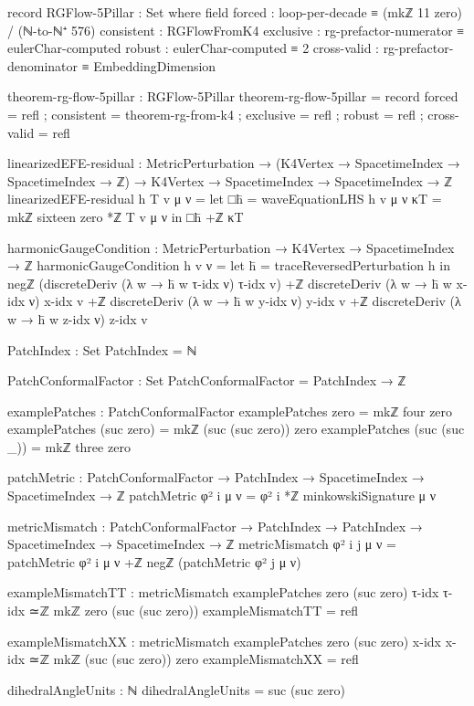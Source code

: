 \documentclass[11pt,a4paper]{book}
\begin{document}
\begin{code}
record RGFlow-5Pillar : Set where
  field
    forced       : loop-per-decade ≡ (mkℤ 11 zero) / (ℕ-to-ℕ⁺ 576)
    consistent   : RGFlowFromK4
    exclusive    : rg-prefactor-numerator ≡ eulerChar-computed
    robust       : eulerChar-computed ≡ 2
    cross-valid  : rg-prefactor-denominator ≡ EmbeddingDimension

theorem-rg-flow-5pillar : RGFlow-5Pillar
theorem-rg-flow-5pillar = record
  { forced      = refl
  ; consistent  = theorem-rg-from-k4
  ; exclusive   = refl
  ; robust      = refl
  ; cross-valid = refl
  }


linearizedEFE-residual : MetricPerturbation → 
                          (K4Vertex → SpacetimeIndex → SpacetimeIndex → ℤ) →
                          K4Vertex → SpacetimeIndex → SpacetimeIndex → ℤ
linearizedEFE-residual h T v μ ν = 
  let □h̄ = waveEquationLHS h v μ ν
      κT  = mkℤ sixteen zero *ℤ T v μ ν
  in □h̄ +ℤ κT


harmonicGaugeCondition : MetricPerturbation → K4Vertex → SpacetimeIndex → ℤ
harmonicGaugeCondition h v ν = 
  let h̄ = traceReversedPerturbation h
  in negℤ (discreteDeriv (λ w → h̄ w τ-idx ν) τ-idx v) +ℤ
     discreteDeriv (λ w → h̄ w x-idx ν) x-idx v +ℤ
     discreteDeriv (λ w → h̄ w y-idx ν) y-idx v +ℤ
     discreteDeriv (λ w → h̄ w z-idx ν) z-idx v


PatchIndex : Set
PatchIndex = ℕ

PatchConformalFactor : Set
PatchConformalFactor = PatchIndex → ℤ

examplePatches : PatchConformalFactor
examplePatches zero = mkℤ four zero
examplePatches (suc zero) = mkℤ (suc (suc zero)) zero
examplePatches (suc (suc _)) = mkℤ three zero

patchMetric : PatchConformalFactor → PatchIndex → 
              SpacetimeIndex → SpacetimeIndex → ℤ
patchMetric φ² i μ ν = φ² i *ℤ minkowskiSignature μ ν

metricMismatch : PatchConformalFactor → PatchIndex → PatchIndex → 
                 SpacetimeIndex → SpacetimeIndex → ℤ
metricMismatch φ² i j μ ν = 
  patchMetric φ² i μ ν +ℤ negℤ (patchMetric φ² j μ ν)

exampleMismatchTT : metricMismatch examplePatches zero (suc zero) τ-idx τ-idx 
                    ≃ℤ mkℤ zero (suc (suc zero))
exampleMismatchTT = refl

exampleMismatchXX : metricMismatch examplePatches zero (suc zero) x-idx x-idx 
                    ≃ℤ mkℤ (suc (suc zero)) zero
exampleMismatchXX = refl

dihedralAngleUnits : ℕ
dihedralAngleUnits = suc (suc zero)


\end{code}
\end{document}

